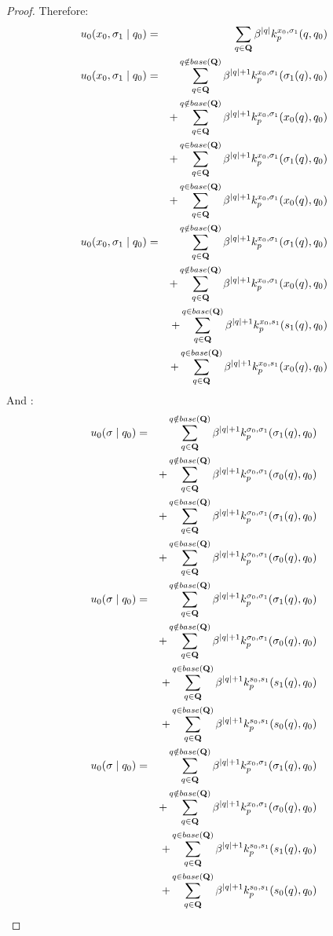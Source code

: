 \begin{proof}
	
	Therefore:
	\begin{eqnarray*}
		u_0(x_0,\sigma_1 \mid q_0) &=& \sum_{q \in \mathbf{Q}} \beta^{|q|} k^{x_0,\sigma_1}_p(q,q_0) \\
		u_0(x_0,\sigma_1 \mid q_0) &=& \sum_{q \in \mathbf{Q}}^{q \notin base(\mathbf{Q})} \beta^{|q|+1} k^{x_0,\sigma_1}_p(\sigma_1(q),q_0) \\
		&& +  \sum_{q \in \mathbf{Q}}^{q \notin base(\mathbf{Q})} \beta^{|q|+1} k^{x_0,\sigma_1}_p(x_0(q),q_0) \\
		&& +  \sum_{q \in \mathbf{Q}}^{q \in base(\mathbf{Q})} \beta^{|q|+1} k^{x_0,\sigma_1}_p(\sigma_1(q),q_0) \\
		&& +  \sum_{q \in \mathbf{Q}}^{q \in base(\mathbf{Q})} \beta^{|q|+1} k^{x_0,\sigma_1}_p(x_0(q),q_0) \\
		u_0(x_0,\sigma_1 \mid q_0) &=& \sum_{q \in \mathbf{Q}}^{q \notin base(\mathbf{Q})} \beta^{|q|+1} k^{x_0,\sigma_1}_p(\sigma_1(q),q_0) \\
		&& +  \sum_{q \in \mathbf{Q}}^{q \notin base(\mathbf{Q})} \beta^{|q|+1} k^{x_0,\sigma_1}_p(x_0(q),q_0) \\
		&& +  \sum_{q \in \mathbf{Q}}^{q \in base(\mathbf{Q})} \beta^{|q|+1} k^{x_0,s_1}_p(s_1(q),q_0) \\
		&& +  \sum_{q \in \mathbf{Q}}^{q \in base(\mathbf{Q})} \beta^{|q|+1} k^{x_0,s_1}_p(x_0(q),q_0) \\
	\end{eqnarray*}
	And : 
	\begin{eqnarray*}
		u_0(\mathbf{\sigma} \mid q_0) &=& \sum_{q \in \mathbf{Q}}^{q \notin base(\mathbf{Q})} \beta^{|q|+1} k^{\sigma_0,\sigma_1}_p(\sigma_1(q),q_0) \\
		&& +  \sum_{q \in \mathbf{Q}}^{q \notin base(\mathbf{Q})} \beta^{|q|+1} k^{\sigma_0,\sigma_1}_p(\sigma_0(q),q_0) \\
		&& +  \sum_{q \in \mathbf{Q}}^{q \in base(\mathbf{Q})} \beta^{|q|+1} k^{\sigma_0,\sigma_1}_p(\sigma_1(q),q_0) \\
		&& +  \sum_{q \in \mathbf{Q}}^{q \in base(\mathbf{Q})} \beta^{|q|+1} k^{\sigma_0,\sigma_1}_p(\sigma_0(q),q_0) \\
		u_0(\mathbf{\sigma} \mid q_0) &=& \sum_{q \in \mathbf{Q}}^{q \notin base(\mathbf{Q})} \beta^{|q|+1} k^{\sigma_0,\sigma_1}_p(\sigma_1(q),q_0) \\
		&& +  \sum_{q \in \mathbf{Q}}^{q \notin base(\mathbf{Q})} \beta^{|q|+1} k^{\sigma_0,\sigma_1}_p(\sigma_0(q),q_0) \\
		&& +  \sum_{q \in \mathbf{Q}}^{q \in base(\mathbf{Q})} \beta^{|q|+1} k^{s_0,s_1}_p(s_1(q),q_0) \\
		&& +  \sum_{q \in \mathbf{Q}}^{q \in base(\mathbf{Q})} \beta^{|q|+1} k^{s_0,s_1}_p(s_0(q),q_0) \\
		u_0(\mathbf{\sigma} \mid q_0) &=& \sum_{q \in \mathbf{Q}}^{q \notin base(\mathbf{Q})} \beta^{|q|+1} k^{x_0,\sigma_1}_p(\sigma_1(q),q_0) \\
		&& +  \sum_{q \in \mathbf{Q}}^{q \notin base(\mathbf{Q})} \beta^{|q|+1} k^{x_0,\sigma_1}_p(\sigma_0(q),q_0) \\
		&& +  \sum_{q \in \mathbf{Q}}^{q \in base(\mathbf{Q})} \beta^{|q|+1} k^{s_0,s_1}_p(s_1(q),q_0) \\
		&& +  \sum_{q \in \mathbf{Q}}^{q \in base(\mathbf{Q})} \beta^{|q|+1} k^{s_0,s_1}_p(s_0(q),q_0) \\
	\end{eqnarray*}


\end{proof}
